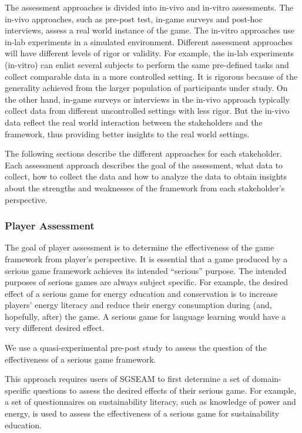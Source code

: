 The assessment approaches is divided into in-vivo and in-vitro assessments. The in-vivo approaches, 
such as pre-post test, in-game surveys and post-hoc interviews, assess a real world instance of the game. 
The in-vitro approaches use in-lab experiments in a simulated environment. Different assessment
approaches will have different levels of rigor or validity. For example, the in-lab experiments (in-vitro) can 
enlist several subjects to perform the same pre-defined tasks and collect comparable data in a more 
controlled setting. It is rigorous because of the generality achieved from the larger population of
participants under study. On the other hand, in-game surveys or interviews in the in-vivo approach typically 
collect data from different uncontrolled settings with less rigor. But the in-vivo data reflect the real world 
interaction between the stakeholders and the framework, thus providing better insights to the real world settings.

The following sections describe the different approaches for each stakeholder.  Each assessment 
approach describes the goal of the assessment, what data to collect, how to collect the data and how to 
analyze the data to obtain insights about the strengths and weaknesses of the framework from each 
stakeholder's perspective.

\subsubsection{Player Assessment}

The goal of player assessment is to determine the effectiveness of the game
framework from player's perspective. It is essential that a game produced by a serious game
framework achieves its intended ``serious'' purpose. The intended purposes of serious games are
always subject specific. For example, the desired effect of a serious game for
energy education and conservation is to increase players' energy literacy and
reduce their energy consumption during (and, hopefully, after) the game. A serious game for
language learning would have a very different desired effect.

\label{Pre-Post effectiveness study}

We use a quasi-experimental pre-post study to assess the question of the effectiveness of a serious game framework. 

This approach requires users of SGSEAM to first determine a set of domain-specific questions to assess the 
desired effects of their serious game. For example, a set of questionnaires on sustainability literacy, such as 
knowledge of power and energy, is used to assess the effectiveness of a serious game for sustainability education.

